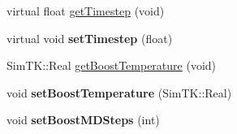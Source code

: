 \begin{DoxyCompactItemize}
\item 
virtual float \hyperlink{classHMCSampler_ab8fb503782cc7fe6951b5189802d174d}{get\+Timestep} (void)
\item 
virtual void {\bfseries set\+Timestep} (float)\hypertarget{classHMCSampler_a47f010ac63622ca8a1f758db5c21e37b}{}\label{classHMCSampler_a47f010ac63622ca8a1f758db5c21e37b}

\item 
Sim\+T\+K\+::\+Real \hyperlink{classHMCSampler_a97914f58682cd08bacffc115e91499e1}{get\+Boost\+Temperature} (void)
\item 
void {\bfseries set\+Boost\+Temperature} (Sim\+T\+K\+::\+Real)\hypertarget{classHMCSampler_a121c0aa27c531b046215daeb8b4e94b4}{}\label{classHMCSampler_a121c0aa27c531b046215daeb8b4e94b4}

\item 
void {\bfseries set\+Boost\+M\+D\+Steps} (int)\hypertarget{classHMCSampler_aa2c6aec792fb63dc1ecd7d372a5867a9}{}\label{classHMCSampler_aa2c6aec792fb63dc1ecd7d372a5867a9}


\end{DoxyCompactItemize}
